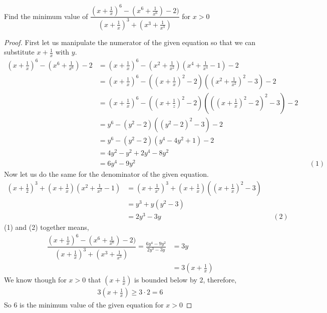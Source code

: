 \documentclass[11pt]{article}
\newenvironment{problem}[2][Problem\!]{\begin{trivlist}
\item[\hskip \labelsep {\bfseries #1}\hskip \labelsep {\bfseries #2}]}{\end{trivlist}}
\renewcommand{\geq}{\geqslant}
\begin{document}
\begin{tcolorbox}
    \begin{problem} {IC | 12/03 | PP 41.}
        Find the minimum value of $\dfrac{(x+\frac{1}{x})^{6} - (x^{6}+\frac{1}{x^{6}}) -2)}{(x+\frac{1}{x})^{3} + (x^{3} + \frac{1}{x^{3}})}$ for $x > 0$
    \end{problem}
\end{tcolorbox}
\begin{proof}
    First let us manipulate the numerator of the given equation so that we can substitute $x + \frac{1}{x}$ with $y$.
    \begin{align*}
        (x+\frac{1}{x})^{6} - (x^{6} + \frac{1}{x^{6}}) -2 &= (x+ \frac{1}{x})^{6} - (x^{2} + \frac{1}{x^{2}})(x^{4} + \frac{1}{x^{4}} - 1) - 2 \\
        &= (x + \frac{1}{x})^{6} - ((x + \frac{1}{x})^{2}-2)((x^{2} + \frac{1}{x^{2}})^{2} - 3) - 2 \\
        &= (x + \frac{1}{x})^{6} - ((x + \frac{1}{z})^{2} - 2)(((x + \frac{1}{x})^{2} - 2)^{2} -3) - 2 \\
        &= y^{6} - (y^{2} - 2)((y^{2}-2)^{2} - 3) - 2 \\
        &= y^{6} - (y^{2} - 2)(y^{4}-4y^{2} + 1) -2 \\
        &= 4y^{2} - y^{2} + 2y^{4} -8y^{2} \\
        &= 6y^{4} - 9y^{2} && (1)
    \end{align*}
    Now let us do the same for the denominator of the given equation.
    \begin{align*}
        (x + \frac{1}{2})^{3} + (x + \frac{1}{x})(x^{2} + \frac{1}{x^{2}} -1) &= (x + \frac{1}{x'})^{3} + (x + \frac{1}{x})((x + \frac{1}{x})^{2} - 3) \\
        &= y^{3} + y(y^{2} - 3) \\
        &= 2y^{3} - 3y && (2)
    \end{align*}
    (1) and (2) together means,
    \begin{align*}
        \dfrac{(x+\frac{1}{x})^{6} - (x^{6}+\frac{1}{x^{6}}) -2)}{(x+\frac{1}{x})^{3} + (x^{3} + \frac{1}{x^{3}})} = \frac{6y^{4} - 9y^{2}}{2y^{3} - 3y} &= 3y \\ 
        &= 3(x + \frac{1}{x})
    \end{align*}
    We know though for $x > 0$ that $(x + \frac{1}{x})$ is bounded below by $2$, therefore,
    \begin{align*}
        3(x + \frac{1}{x}) \geq 3\cdot 2 = 6
    \end{align*}
    So $6$ is the minimum value of the given equation for $x> 0$
\end{proof}
\end{document}
